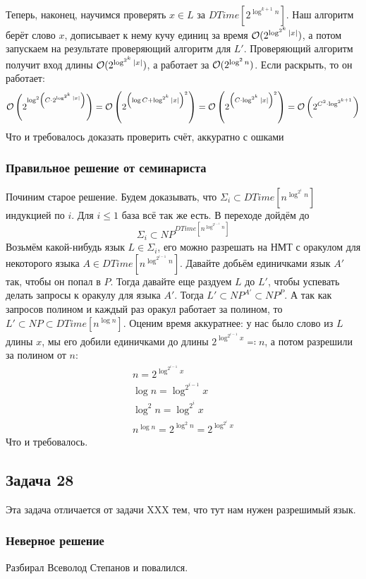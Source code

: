 		Теперь, наконец, научимся проверять $x \in L$ за $DTime[2^{\log^{k+1} n}]$.
		Наш алгоритм берёт слово $x$, дописывает к нему кучу единиц за время $\mathcal O(2^{\log^{2^k} |x|})$,
		а потом запускаем на результате проверяющий алгоритм для $L'$.
		Проверяющий алгоритм получит вход длины $\mathcal O(2^{\log^{2^k} |x|})$, а работает
		за $\mathcal O(2^{\log^2 n})$.
		Если раскрыть, то он работает:
		\[
			\mathcal O\left(2^{\log^2 \left(C \cdot 2^{\log^{2^k} |x|}\right) }\right) =
			\mathcal O\left(2^{\left(\log C + \log^{2^k} |x|\right)^2}\right) =
			\mathcal O\left(2^{\left(C \cdot \log^{2^k} |x|\right)^2}\right) =
			\mathcal O\left(2^{C^2 \cdot \log^{2^{k+1}}}\right)
		\]
		Что и требовалось доказать
		\TODO проверить счёт, аккуратно с ошками

	\subsubsection{Правильное решение от семинариста}
		Починим старое решение.
		Будем доказывать, что $\Sigma_i \subset DTime[n^{\log^{2^i} n}]$ индукцией по $i$.
		Для $i \le 1$ база всё так же есть.
		В переходе дойдём до
		\[ \Sigma_i \subset NP^{DTime[n^{\log^{2^{i-1}} n}]} \]
		Возьмём какой-нибудь язык $L\in\Sigma_i$, его можно разрешать на НМТ
		с оракулом для некоторого языка $A \in DTime[n^{\log^{2^{i-1}} n}]$.
		Давайте добьём единичками язык $A'$ так, чтобы он попал в $P$.
		Тогда давайте еще раздуем $L$ до $L'$, чтобы успевать делать запросы к оракулу
		для языка $A'$.
		Тогда $L' \subset NP^{A'} \subset NP^P$.
		А так как запросов полином и каждый раз оракул работает за полином, то $L' \subset NP \subset DTime[n^{\log n}]$.
		Оценим время аккуратнее: у нас было слово из $L$ длины $x$,
		мы его добили единичками до длины $2^{\log^{2^{i-1}} x} \eqcolon n$, а потом разрешили за полином от $n$:
		\begin{gather*}
			n = 2^{\log^{2^{i-1}} x} \\
			\log n = \log^{2^{i-1}} x \\
			\log^2 n = \log^{2^i} x \\
			n^{\log n} = 2^{\log^2n} = 2^{\log^{2^i} x}
		\end{gather*}
		Что и требовалось.

\subsection{Задача 28}
	Эта задача отличается от задачи XXX тем, что тут нам нужен разрешимый язык.
	\subsubsection{Неверное решение}
		Разбирал Всеволод Степанов и повалился.

